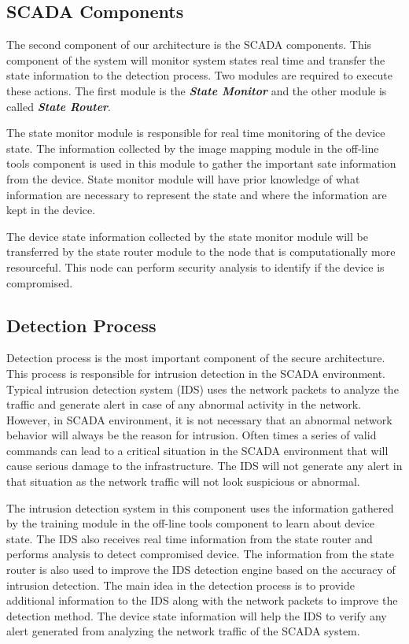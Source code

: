 \documentclass[letterpaper, 10 pt, conference]{ieeeconf}  %
\begin{document}
\subsection{SCADA Components}
The second component of our architecture is the SCADA components. This component of the system will monitor system states real time and transfer the state information to the detection process. Two modules are required to execute these actions. The first module is the \textit{\textbf{State Monitor}} and the other module is called \textit{\textbf{State Router}}.
\par The state monitor module is responsible for real time monitoring of the device state. The information collected by the image mapping module in the off-line tools component is used in this module to gather the important sate information from the device. State monitor module will have prior knowledge of what information are necessary to represent the state and where the information are kept in the device. 
\par The device state information collected by the state monitor module will be transferred by the state router module to the node that is computationally more resourceful. This node can perform security analysis to identify if the device is compromised.
\subsection{Detection Process}
Detection process is the most important component of the secure architecture. This process is responsible for intrusion detection in the SCADA environment. Typical intrusion detection system (IDS) uses the network packets to analyze the traffic and generate alert in case of any abnormal activity in the network. However, in SCADA environment, it is not necessary that an abnormal network behavior will always be the reason for intrusion. Often times a series of valid commands can lead to a critical situation in the SCADA environment that will cause serious damage to the infrastructure. The IDS will not generate any alert in that situation as the network traffic will not look suspicious or abnormal.
\par The intrusion detection system in this component uses the information gathered by the training module in the off-line tools component to learn about device state. The IDS also receives real time information from the state router and performs analysis to detect compromised device. The information from the state router is also used to improve the IDS detection engine based on the accuracy of intrusion detection. The main idea in the detection process is to provide additional information to the IDS along with the network packets to improve the detection method. The device state information will help the IDS to verify any alert generated from analyzing the network traffic of the SCADA system. 
\end{document}
